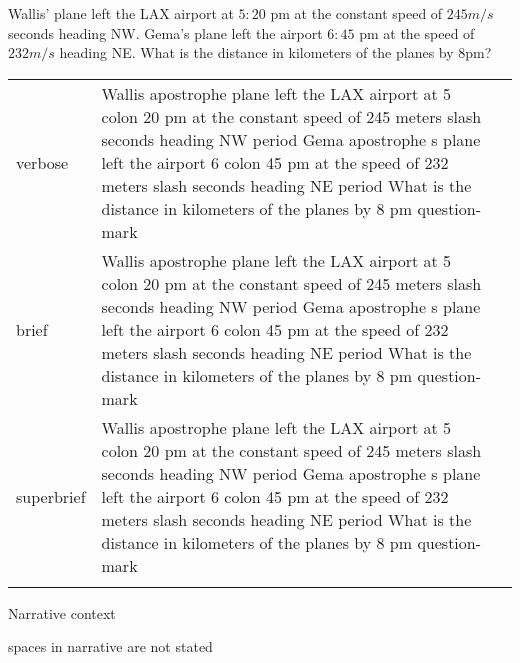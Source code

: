 
\R
\E Wallis' plane left the LAX airport at $5:20$ pm at the constant speed of $245
m/s$ seconds heading NW. Gema's plane left the airport $6:45$ pm
at the speed of $232 m/s$ heading NE. What is the distance
in kilometers of the planes by $8$pm?

\begin{longtable}[c]{@{}lll@{}}
\toprule\addlinespace
verbose & Wallis apostrophe plane left the LAX airport at 5 colon 20 pm
at the constant speed of 245 meters slash seconds heading NW period Gema
apostrophe s plane left the airport 6 colon 45 pm at the speed of 232
meters slash seconds heading NE period What is the distance in
kilometers of the planes by 8 pm question-mark &

\\\addlinespace
brief & Wallis apostrophe plane left the LAX airport at 5 colon 20 pm at
the constant speed of 245 meters slash seconds heading NW period Gema
apostrophe s plane left the airport 6 colon 45 pm at the speed of 232
meters slash seconds heading NE period What is the distance in
kilometers of the planes by 8 pm question-mark &

\\\addlinespace
superbrief & Wallis apostrophe plane left the LAX airport at 5 colon 20
pm at the constant speed of 245 meters slash seconds heading NW period
Gema apostrophe s plane left the airport 6 colon 45 pm at the speed of
232 meters slash seconds heading NE period What is the distance in
kilometers of the planes by 8 pm question-mark &

\\\addlinespace
\bottomrule
\end{longtable}


\R
Narrative context

\R
spaces in narrative are not stated

